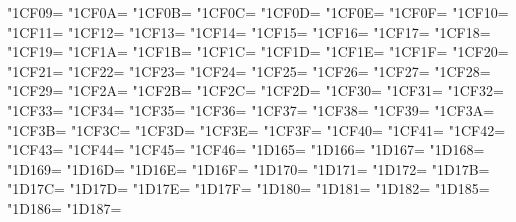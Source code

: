\XeTeXcharclass"1CF09=\KclassCM
\XeTeXcharclass"1CF0A=\KclassCM
\XeTeXcharclass"1CF0B=\KclassCM
\XeTeXcharclass"1CF0C=\KclassCM
\XeTeXcharclass"1CF0D=\KclassCM
\XeTeXcharclass"1CF0E=\KclassCM
\XeTeXcharclass"1CF0F=\KclassCM
\XeTeXcharclass"1CF10=\KclassCM
\XeTeXcharclass"1CF11=\KclassCM
\XeTeXcharclass"1CF12=\KclassCM
\XeTeXcharclass"1CF13=\KclassCM
\XeTeXcharclass"1CF14=\KclassCM
\XeTeXcharclass"1CF15=\KclassCM
\XeTeXcharclass"1CF16=\KclassCM
\XeTeXcharclass"1CF17=\KclassCM
\XeTeXcharclass"1CF18=\KclassCM
\XeTeXcharclass"1CF19=\KclassCM
\XeTeXcharclass"1CF1A=\KclassCM
\XeTeXcharclass"1CF1B=\KclassCM
\XeTeXcharclass"1CF1C=\KclassCM
\XeTeXcharclass"1CF1D=\KclassCM
\XeTeXcharclass"1CF1E=\KclassCM
\XeTeXcharclass"1CF1F=\KclassCM
\XeTeXcharclass"1CF20=\KclassCM
\XeTeXcharclass"1CF21=\KclassCM
\XeTeXcharclass"1CF22=\KclassCM
\XeTeXcharclass"1CF23=\KclassCM
\XeTeXcharclass"1CF24=\KclassCM
\XeTeXcharclass"1CF25=\KclassCM
\XeTeXcharclass"1CF26=\KclassCM
\XeTeXcharclass"1CF27=\KclassCM
\XeTeXcharclass"1CF28=\KclassCM
\XeTeXcharclass"1CF29=\KclassCM
\XeTeXcharclass"1CF2A=\KclassCM
\XeTeXcharclass"1CF2B=\KclassCM
\XeTeXcharclass"1CF2C=\KclassCM
\XeTeXcharclass"1CF2D=\KclassCM
\XeTeXcharclass"1CF30=\KclassCM
\XeTeXcharclass"1CF31=\KclassCM
\XeTeXcharclass"1CF32=\KclassCM
\XeTeXcharclass"1CF33=\KclassCM
\XeTeXcharclass"1CF34=\KclassCM
\XeTeXcharclass"1CF35=\KclassCM
\XeTeXcharclass"1CF36=\KclassCM
\XeTeXcharclass"1CF37=\KclassCM
\XeTeXcharclass"1CF38=\KclassCM
\XeTeXcharclass"1CF39=\KclassCM
\XeTeXcharclass"1CF3A=\KclassCM
\XeTeXcharclass"1CF3B=\KclassCM
\XeTeXcharclass"1CF3C=\KclassCM
\XeTeXcharclass"1CF3D=\KclassCM
\XeTeXcharclass"1CF3E=\KclassCM
\XeTeXcharclass"1CF3F=\KclassCM
\XeTeXcharclass"1CF40=\KclassCM
\XeTeXcharclass"1CF41=\KclassCM
\XeTeXcharclass"1CF42=\KclassCM
\XeTeXcharclass"1CF43=\KclassCM
\XeTeXcharclass"1CF44=\KclassCM
\XeTeXcharclass"1CF45=\KclassCM
\XeTeXcharclass"1CF46=\KclassCM
\XeTeXcharclass"1D165=\KclassCM
\XeTeXcharclass"1D166=\KclassCM
\XeTeXcharclass"1D167=\KclassCM
\XeTeXcharclass"1D168=\KclassCM
\XeTeXcharclass"1D169=\KclassCM
\XeTeXcharclass"1D16D=\KclassCM
\XeTeXcharclass"1D16E=\KclassCM
\XeTeXcharclass"1D16F=\KclassCM
\XeTeXcharclass"1D170=\KclassCM
\XeTeXcharclass"1D171=\KclassCM
\XeTeXcharclass"1D172=\KclassCM
\XeTeXcharclass"1D17B=\KclassCM
\XeTeXcharclass"1D17C=\KclassCM
\XeTeXcharclass"1D17D=\KclassCM
\XeTeXcharclass"1D17E=\KclassCM
\XeTeXcharclass"1D17F=\KclassCM
\XeTeXcharclass"1D180=\KclassCM
\XeTeXcharclass"1D181=\KclassCM
\XeTeXcharclass"1D182=\KclassCM
\XeTeXcharclass"1D185=\KclassCM
\XeTeXcharclass"1D186=\KclassCM
\XeTeXcharclass"1D187=\KclassCM
